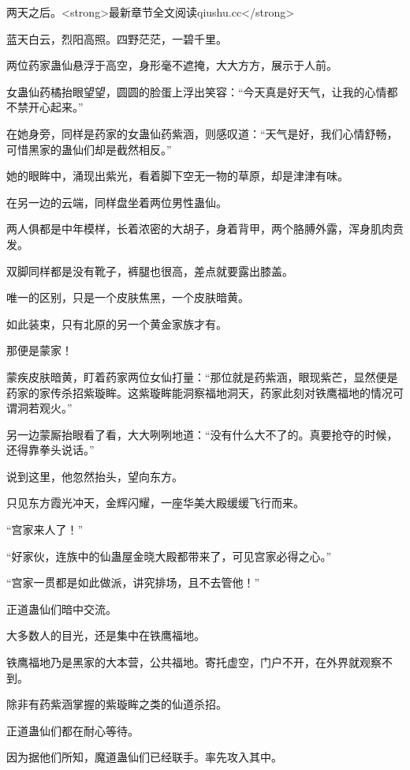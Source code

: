 
\begin{this_body}

两天之后。<strong>最新章节全文阅读qiushu.cc</strong>

蓝天白云，烈阳高照。四野茫茫，一碧千里。

两位药家蛊仙悬浮于高空，身形毫不遮掩，大大方方，展示于人前。

女蛊仙药橘抬眼望望，圆圆的脸蛋上浮出笑容：“今天真是好天气，让我的心情都不禁开心起来。”

在她身旁，同样是药家的女蛊仙药紫涵，则感叹道：“天气是好，我们心情舒畅，可惜黑家的蛊仙们却是截然相反。”

她的眼眸中，涌现出紫光，看着脚下空无一物的草原，却是津津有味。

在另一边的云端，同样盘坐着两位男性蛊仙。

两人俱都是中年模样，长着浓密的大胡子，身着背甲，两个胳膊外露，浑身肌肉贲发。

双脚同样都是没有靴子，裤腿也很高，差点就要露出膝盖。

唯一的区别，只是一个皮肤焦黑，一个皮肤暗黄。

如此装束，只有北原的另一个黄金家族才有。

那便是蒙家！

蒙疾皮肤暗黄，盯着药家两位女仙打量：“那位就是药紫涵，眼现紫芒，显然便是药家的家传杀招紫璇眸。这紫璇眸能洞察福地洞天，药家此刻对铁鹰福地的情况可谓洞若观火。”

另一边蒙厮抬眼看了看，大大咧咧地道：“没有什么大不了的。真要抢夺的时候，还得靠拳头说话。”

说到这里，他忽然抬头，望向东方。

只见东方霞光冲天，金辉闪耀，一座华美大殿缓缓飞行而来。

“宫家来人了！”

“好家伙，连族中的仙蛊屋金晓大殿都带来了，可见宫家必得之心。”

“宫家一贯都是如此做派，讲究排场，且不去管他！”

正道蛊仙们暗中交流。

大多数人的目光，还是集中在铁鹰福地。

铁鹰福地乃是黑家的大本营，公共福地。寄托虚空，门户不开，在外界就观察不到。

除非有药紫涵掌握的紫璇眸之类的仙道杀招。

正道蛊仙们都在耐心等待。

因为据他们所知，魔道蛊仙们已经联手。率先攻入其中。


\end{this_body}
